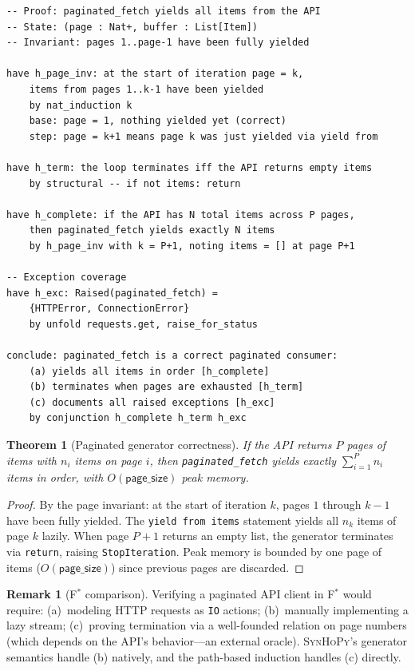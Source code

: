 \documentclass[11pt,a4paper]{report}
\theoremstyle{definition}
\newtheorem{remark}[definition]{Remark}
\theoremstyle{plain}
\newtheorem{theorem}[definition]{Theorem}
\newcommand{\fstar}{F$^{*}$}
\newcommand{\synhopy}{\textsc{SynHoPy}}
\begin{document}
\begin{lstlisting}[style=proof]
-- Proof: paginated_fetch yields all items from the API
-- State: (page : Nat+, buffer : List[Item])
-- Invariant: pages 1..page-1 have been fully yielded

have h_page_inv: at the start of iteration page = k,
    items from pages 1..k-1 have been yielded
    by nat_induction k
    base: page = 1, nothing yielded yet (correct)
    step: page = k+1 means page k was just yielded via yield from

have h_term: the loop terminates iff the API returns empty items
    by structural -- if not items: return

have h_complete: if the API has N total items across P pages,
    then paginated_fetch yields exactly N items
    by h_page_inv with k = P+1, noting items = [] at page P+1

-- Exception coverage
have h_exc: Raised(paginated_fetch) =
    {HTTPError, ConnectionError}
    by unfold requests.get, raise_for_status

conclude: paginated_fetch is a correct paginated consumer:
    (a) yields all items in order [h_complete]
    (b) terminates when pages are exhausted [h_term]
    (c) documents all raised exceptions [h_exc]
    by conjunction h_complete h_term h_exc
\end{lstlisting}

\begin{theorem}[Paginated generator correctness]
If the API returns $P$ pages of items with $n_i$ items on page $i$,
then \texttt{paginated\_fetch} yields exactly $\sum_{i=1}^{P} n_i$ items
in order, with $O(\mathsf{page\_size})$ peak memory.
\end{theorem}
\begin{proof}
By the page invariant: at the start of iteration $k$, pages $1$ through
$k-1$ have been fully yielded.  The \texttt{yield from items} statement
yields all $n_k$ items of page $k$ lazily.  When page $P+1$ returns
an empty list, the generator terminates via \texttt{return}, raising
\texttt{StopIteration}.  Peak memory is bounded by one page of items
($O(\mathsf{page\_size})$) since previous pages are discarded.
\end{proof}

\begin{remark}[\fstar{} comparison]
Verifying a paginated API client in \fstar{} would require:
(a)~modeling HTTP requests as \lstinline[style=fstar]|IO| actions;
(b)~manually implementing a lazy stream;
(c)~proving termination via a well-founded relation on page numbers
(which depends on the API's behavior---an external oracle).
\synhopy{}'s generator semantics handle (b) natively, and the path-based
induction handles (c) directly.
\end{remark}
\end{document}
